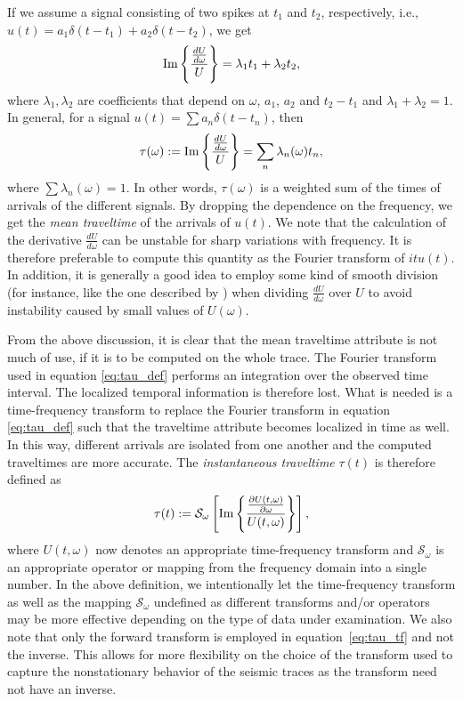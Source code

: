 If we assume a signal consisting of two spikes at $t_1$ and $t_2$, respectively, i.e.,\ $u(t)= a_1\delta(t-t_1)+a_2\delta(t-t_2)$, we get 
\begin{equation}
   \mathrm{Im}\left\{\frac{\frac{dU}{d\omega}}{U}\right\} = \lambda_1 t_1 + \lambda_2t_2, 
\end{equation}
where $\lambda_1, \lambda_2$ are coefficients that depend on $\omega$, $a_1$, $a_2$ and $t_2-t_1$ and $\lambda_1+\lambda_2 = 1$. In general, for a signal $u(t)=\sum a_n\delta(t-t_n)$, then  
\begin{equation}\label{eq:tau}
   \tau(\omega) := \mathrm{Im}\left\{\frac{\frac{dU}{d\omega}}{U}\right\} = \sum_n \lambda_n(\omega) t_n, 
\end{equation}
where $\sum\lambda_n(\omega)=1$. In other words, $\tau(\omega)$ is a weighted sum of the times of arrivals of the different signals. By dropping the dependence on the frequency, we get the \emph{mean traveltime} of the arrivals of $u(t)$. We note that the calculation of the derivative $\frac{dU}{d\omega}$ can be unstable for sharp variations with frequency. It is therefore preferable to compute this quantity as the Fourier transform of $itu(t)$. In addition, it is generally a good idea to employ some kind of smooth division (for instance, like the one described by \cite{fomel07local}) when dividing $\frac{dU}{d\omega}$ over $U$ to avoid instability caused by small values of $U(\omega)$. 


From the above discussion, it is clear that the mean traveltime attribute is not much of use, if it is to be computed on the whole trace. The Fourier transform used in equation \ref{eq:tau_def} performs an integration over the observed time interval. The localized temporal information is therefore lost. What is needed is a time-frequency transform to replace the Fourier transform in equation \ref{eq:tau_def} such that the traveltime attribute becomes localized in time as well. In this way, different arrivals are isolated from one another and the computed traveltimes are more accurate.  The \emph{instantaneous traveltime} $\tau(t)$ is therefore defined as
\begin{equation}\label{eq:tau_tf}
   \tau(t) := \mathcal S_\omega \left[\mathrm{Im}\left\{\frac{\frac{\partial U(t,\omega)}{\partial \omega}}{U(t,\omega)}\right\}\right],
\end{equation}
where $U(t,\omega)$ now denotes an appropriate time-frequency transform and $\mathcal S_\omega$ is an appropriate operator or mapping from the frequency domain into a single number. In the above definition, we intentionally let the time-frequency transform as well as the mapping $\mathcal S_\omega$ undefined as different transforms and/or operators may be more effective depending on the type of data under examination. We also note that only the forward transform is employed in equation~\ref{eq:tau_tf} and not the inverse. This allows for more flexibility on the choice of the transform used to capture the nonstationary behavior of the seismic traces as the transform need not have an inverse. 

